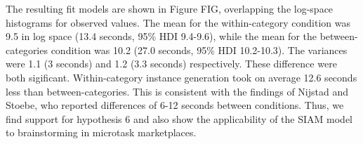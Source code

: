 The resulting fit models are shown in Figure FIG, overlapping the log-space histograms for observed values. The mean for the within-category condition was 9.5 in log space (13.4 seconds, 95\% HDI 9.4-9.6), while the mean for the between-categories condition was 10.2 (27.0 seconds, 95\% HDI 10.2-10.3). The variances were 1.1 (3 seconds) and 1.2 (3.3 seconds) respectively. These difference were both sigificant. Within-category instance generation took on average 12.6 seconds less than between-categories. This is consistent with the findings of Nijstad and Stoebe, who reported differences of 6-12 seconds between conditions. Thus, we find support for hypothesis 6 and also show the applicability of the SIAM model to brainstorming in microtask marketplaces.







